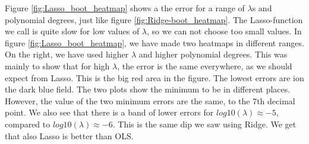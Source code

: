 \documentclass[reprint,english,notitlepage,aps,nobalancelastpage,nofootinbib]{revtex4-1}  %
\begin{document}
Figure \ref{fig:Lasso_boot_heatmap} shows a the error for a range of $\lambda$s and polynomial degrees, just like figure \ref{fig:Ridge-boot_heatmap}. The Lasso-function we call is quite slow for low values of $\lambda$, so we can not choose too small values.  In figure \ref{fig:Lasso_boot_heatmap}, we have made two heatmaps in different ranges. On the right, we have used higher $\lambda$ and higher polynomial degrees. This was mainly to show that for high $\lambda$, the error is the same everywhere, as we should expect from Lasso. This is the big red area in the figure. The lowest errors are ion the dark blue field. The two plots show the minimum to be in different places. However, the value of the two minimum errors are the same, to the 7th decimal point. We also see that there is a band of lower errors for $log10(\lambda)\approx-5$, compared to $log10(\lambda)\approx-6$. This is the same dip we saw using Ridge. We get that also Lasso is better than OLS.
\end{document}
